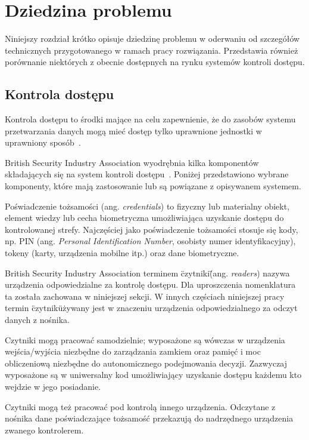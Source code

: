 \chapter{Dziedzina problemu}
\label{chap:problem-domain}

	Niniejszy rozdział krótko opisuje dziedzinę problemu w oderwaniu od szczegółów technicznych przygotowanego w ramach pracy rozwiązania. Przedstawia również porównanie niektórych z obecnie dostępnych na rynku systemów kontroli dostępu.

	\section{Kontrola dostępu}

		Kontrola dostępu to środki mające na celu zapewnienie, że do zasobów systemu przetwarzania danych mogą mieć dostęp tylko uprawnione jednostki w uprawniony sposób~\cite{pkn2002}.

		British Security Industry Association wyodrębnia kilka komponentów składających się na system kontroli dostępu~\cite{bsia2016}. Poniżej przedstawiono wybrane komponenty, które mają zastosowanie lub są powiązane z opisywanem systemem.

		Poświadczenie tożsamości (ang. \textit{credentials}) to fizyczny lub materialny obiekt, element wiedzy lub cecha biometryczna umożliwiająca uzyskanie dostępu do kontrolowanej strefy. Najczęściej jako poświadczenie tożsamości stosuje się kody, np. PIN (ang. \textit{Personal Identification Number}, osobisty numer identyfikacyjny), tokeny (karty, urządzenia mobilne itp.) oraz dane biometryczne.~\cite{bsia2016}

		British Security Industry Association terminem \"czytniki\" (ang. \textit{readers}) nazywa urządzenia odpowiedzialne za kontrolę dostępu. Dla uproszczenia nomenklatura ta została zachowana w niniejszej sekcji. W innych częściach niniejszej pracy termin \"czytnik\" używany jest w znaczeniu urządzenia odpowiedzialnego za odczyt danych z nośnika.

		Czytniki mogą pracować samodzielnie; wyposażone są wówczas w urządzenia wejścia/wyjścia niezbędne do zarządzania zamkiem oraz pamięć i moc obliczeniową niezbędne do autonomicznego podejmowania decyzji. Zazwyczaj wyposażone są w uniwersalny kod umożliwiający uzyskanie dostępu każdemu kto wejdzie w jego posiadanie.~\cite{bsia2016}

		Czytniki mogą też pracować pod kontrolą innego urządzenia. Odczytane z nośnika dane poświadczające tożsamość przekazują do nadrzędnego urządzenia zwanego kontrolerem.~\cite{bsia2016}

